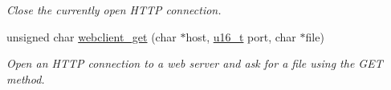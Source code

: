 \begin{CompactItemize}
\begin{CompactList}\small\item\em Close the currently open HTTP connection. \item\end{CompactList}\item 
unsigned char \hyperlink{a00079_gf9385ef9ecc74c7d53ff2f15e62bfde3}{webclient\_\-get} (char $\ast$host, \hyperlink{a00070_gfc6499c1f28697aa3bfc2804d496fd11}{u16\_\-t} port, char $\ast$file)
\begin{CompactList}\small\item\em Open an HTTP connection to a web server and ask for a file using the GET method. \item\end{CompactList}\end{CompactItemize}
